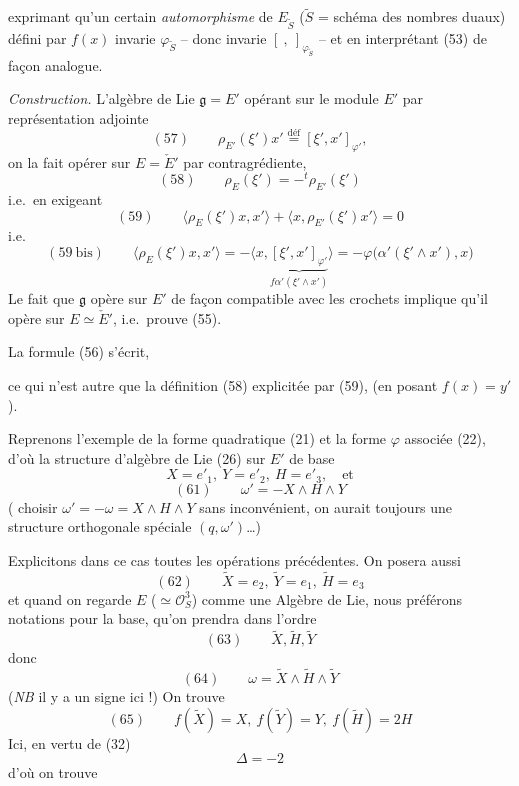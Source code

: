 \documentclass[11pt,a4paper]{article}
\begin{document}
exprimant qu'un certain \emph{automorphisme} de $E_{\tilde{S}}$ ($\tilde{S}$ =
schéma des nombres duaux) défini par $f(x)$ invarie $\varphi_{\tilde{S}}$ -- donc
invarie $[\ ,\ ]_{\varphi_{\tilde{S}}}$ -- et en interprétant (53) de façon analogue.

\emph{Construction.} L'algèbre de Lie \struck{\ill{}} $\mathfrak{g} = E'$ opérant
sur le module $E'$ par représentation adjointe
\[
  (57) \qquad \rho_{E'}(\xi')x' \overset{\text{déf}}{=} [\xi', x']_{\varphi'} ,
\]
on la fait opérer sur $E = \check{E}'$ par contragrédiente,
\[
  (58) \qquad \rho_E(\xi') = -{}^{t}\rho_{E'}(\xi')
\]
i.e.\ en exigeant
\[
  (59) \qquad \bigl\langle \rho_E(\xi')x, x' \bigr\rangle + \bigl\langle x, \rho_{E'}(\xi')x' \bigr\rangle = 0
\]
i.e.
\[
  (59\ \text{bis}) \qquad \bigl\langle \rho_E(\xi')x, x' \bigr\rangle = -\bigl\langle x, \underbrace{[\xi', x']_{\varphi'}}_{f\alpha'(\xi' \wedge x')} \bigr\rangle
  = -\varphi\bigl(\alpha'(\xi' \wedge x'), x\bigr)
\]
Le fait que $\mathfrak{g}$ opère sur $E'$ de façon compatible avec les crochets
implique qu'il opère sur $E \simeq \check{E}'$, i.e.\ prouve (55).

La formule (56) s'écrit, 

ce qui n'est autre que la définition (58) explicitée par (59), (en posant
$f(x) = y'$).



Reprenons l'exemple de la forme quadratique (21) et la forme $\varphi$ associée
(22), d'où la structure d'algèbre de Lie (26) sur $E'$ de base
\[
  X = e'_1 ,\ Y = e'_2 ,\ H = e'_3 , \quad \text{et}
\]
\[
  (61) \qquad \omega' = -X \wedge H \wedge Y
\]
(  
choisir $\omega' = -\omega = X \wedge H \wedge Y$ sans inconvénient, on aurait
toujours une structure orthogonale spéciale $(q, \omega')$\ldots)

Explicitons dans ce cas toutes les opérations précédentes. On posera aussi
\[
  (62) \qquad \tilde{X} = e_2 ,\ \tilde{Y} = e_1 ,\ \tilde{H} = e_3
\]
et quand on regarde $E$ ($\simeq \mathcal{O}_S^3$) comme une Algèbre de Lie, nous
préférons  notations pour la base, qu'on prendra dans l'ordre
\[
  (63) \qquad \tilde{X}, \tilde{H}, \tilde{Y}
\]
donc
\[
  (64) \qquad \omega = \tilde{X} \wedge \tilde{H} \wedge \tilde{Y}
\]
(\emph{NB} il y a un signe ici !)
On trouve
\[
  (65) \qquad f(\tilde{X}) = X ,\ f(\tilde{Y}) = Y ,\ f(\tilde{H}) = 2H
\]
Ici, en vertu de (32)
\[
  \Delta = -2
\]
d'où on trouve
\end{document}
